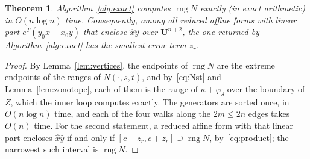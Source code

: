 \documentclass[10pt]{article}
\newtheorem{theorem}{Theorem}
\theoremstyle{definition}
\newcommand{\U}{\mathbf{U}}
\newcommand{\rng}{\operatorname{rng}}
\begin{document}
\begin{theorem}
\label{thm:exact}
Algorithm~\ref{alg:exact} computes $\rng N$ exactly (in exact arithmetic) in $O(n\log n)$ time. Consequently, among all reduced affine forms with linear part $e^T(y_0x+x_0y)$ that enclose $\hat x\hat y$ over $\U^{n+2}$, the one returned by Algorithm~\ref{alg:exact} has the smallest error term $z_r$.
\end{theorem}
\begin{proof}
By Lemma~\ref{lem:vertices}, the endpoints of $\rng N$ are the extreme endpoints of the ranges of $N(\cdot,s,t)$, and by~\eqref{eq:Nst} and Lemma~\ref{lem:zonotope}, each of them is the range of $\kappa+\varphi_\delta$ over the boundary of $Z$, which the inner loop computes exactly. The generators are sorted once, in $O(n\log n)$ time, and each of the four walks along the $2m\le 2n$ edges takes $O(n)$ time. For the second statement, a reduced affine form with that linear part encloses $\hat x\hat y$ if and only if $[c-z_r,c+z_r]\supseteq\rng N$, by~\eqref{eq:product}; the narrowest such interval is $\rng N$.
\end{proof}
\end{document}
